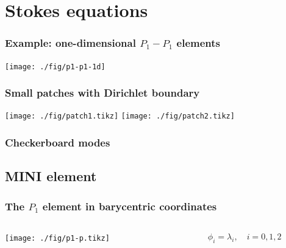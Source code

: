 \documentclass[ignorenonframetext,notheorems,aspectratio=1610]{beamer}
\begin{document}
\section{Stokes equations}


\begin{frame}
  \frametitle{Example: one-dimensional $P_1-P_1$ elements}
  \begin{center}
      \texttt{[image: ./fig/p1-p1-1d]}
  \end{center}
\end{frame}

\begin{frame}
  \frametitle{Small patches with Dirichlet boundary}
  \begin{center}
    \hfill
    \texttt{[image: ./fig/patch1.tikz]}
    \hfill
    \texttt{[image: ./fig/patch2.tikz]}
    \hfill\mbox{}
  \end{center}
\end{frame}

\begin{frame}
  \frametitle{Checkerboard modes}
  
\end{frame}

\subsection{MINI element}

\begin{frame}
  \frametitle{The $P_1$ element in barycentric coordinates}
  \begin{columns}
    \begin{column}{.5\textwidth}
      \begin{center}
        \texttt{[image: ./fig/p1-p.tikz]}
      \end{center}
    \end{column}
    \begin{column}{.5\textwidth}
      \begin{gather*}
        \phi_i = \lambda_i,
        \quad i=0,1,2
      \end{gather*}
    \end{column}
  \end{columns}
\end{frame}
\end{document}
